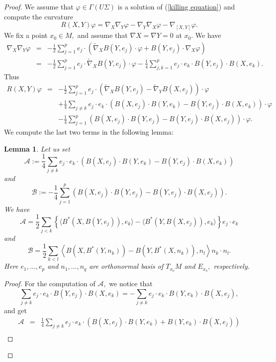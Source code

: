 \documentclass{amsart}
\newtheorem{lem}{Lemma}[section]
\begin{document}
\begin{proof}
We assume that $\varphi\in\Gamma(U\Sigma)$ is a solution of (\ref{killing equation}) and compute the curvature 
\begin{equation*}
R(X,Y)\varphi=\nabla_X\nabla_Y\varphi-\nabla_Y\nabla_X\varphi-\nabla_{[X,Y]}\varphi.
\end{equation*}
We fix a point $x_0\in M,$ and assume that $\nabla X=\nabla Y=0$ at $x_0.$ We have
\begin{eqnarray*}
\nabla_X\nabla_Y\varphi&=&-\frac{1}{2}\sum_{j=1}^pe_j\cdot\left(\tilde{\nabla}_X B(Y,e_j)\cdot\varphi+B(Y,e_j)\cdot\nabla_X\varphi\right)\\
&=&-\frac{1}{2}\sum_{j=1}^pe_j\cdot\tilde{\nabla}_X B(Y,e_j)\cdot\varphi-\frac{1}{4}\sum_{j,k=1}^pe_j\cdot e_k\cdot B(Y,e_j)\cdot B(X,e_k).
\end{eqnarray*}
Thus
\begin{eqnarray}
R(X,Y)\varphi&=&-\frac{1}{2}\sum_{j=1}^pe_j\cdot\left(\tilde{\nabla}_X B(Y,e_j)-\tilde{\nabla}_Y B(X,e_j)\right)\cdot\varphi\nonumber\\
&&+\frac{1}{4}\sum_{j\neq k} e_j\cdot e_k\cdot \left(B(X,e_j)\cdot B(Y,e_k)-B(Y,e_j)\cdot B(X,e_k)\right)\cdot\varphi\label{R function B}\\
&&-\frac{1}{4}\sum_{j=1}^p\left(B(X,e_j)\cdot B(Y,e_j)-B(Y,e_j)\cdot B(X,e_j)\right)\cdot\varphi.\nonumber
\end{eqnarray}
We compute the last two terms in the following lemma:
\begin{lem} \label{computation AB} Let us set
$$\mathcal{A}:=\frac{1}{4}\sum_{j\neq k} e_j\cdot e_k\cdot \left(B(X,e_j)\cdot B(Y,e_k)-B(Y,e_j)\cdot B(X,e_k)\right)$$
and
$$\mathcal{B}:=-\frac{1}{4}\sum_{j=1}^p\left(B(X,e_j)\cdot B(Y,e_j)-B(Y,e_j)\cdot B(X,e_j)\right).$$
We have
$$\mathcal{A}=\frac{1}{2}\sum_{j< k}\left\{\langle B^*(X,B(Y,e_j)),e_k\rangle- \langle B^*(Y,B(X,e_j)),e_k\rangle\right\}e_j\cdot e_k$$
and
$$\mathcal{B}=\frac{1}{2}\sum_{k<l}\left\langle B(X,B^*(Y,n_k))-B(Y,B^*(X,n_k)),n_l\right\rangle n_k\cdot n_l.$$
Here $e_1,\ldots,e_p$ and $n_1,\ldots,n_q$ are orthonormal basis of $T_{x_o}M$ and $E_{x_o},$ respectively.
\end{lem}
\begin{proof}
For the computation of $\mathcal{A},$ we notice that 
$$\sum_{j\neq k} e_j\cdot e_k\cdot B(Y,e_j)\cdot B(X,e_k)=-\sum_{j\neq k} e_j\cdot e_k\cdot B(Y,e_k)\cdot B(X,e_j),$$
and get
\begin{eqnarray*}
\mathcal{A}&=&\frac{1}{4}\sum_{j\neq k} e_j\cdot e_k\cdot \left(B(X,e_j)\cdot B(Y,e_k)+B(Y,e_k)\cdot B(X,e_j)\right)\\

\end{eqnarray*}
\end{proof}
\end{proof}
\end{document}

